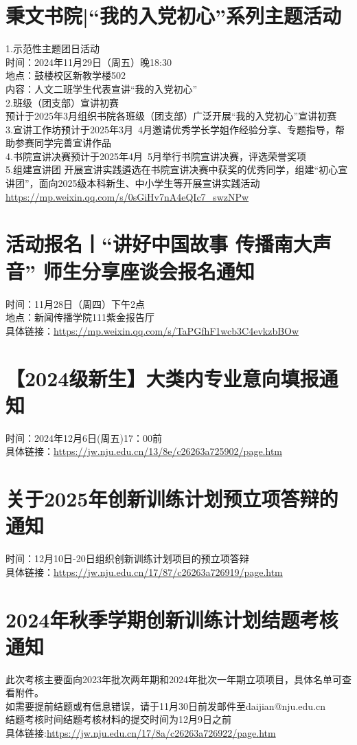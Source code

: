 \documentclass[letterpaper, 12pt]{article}
\begin{document}
\begin{multicols}{2}
\section{ 秉文书院|“我的入党初心”系列主题活动}
1.示范性主题团日活动\\
时间：2024年11月29日（周五）晚18:30\\
地点：鼓楼校区新教学楼502\\
内容：人文二班学生代表宣讲“我的入党初心”\\
2.班级（团支部）宣讲初赛\\
预计于2025年3月组织书院各班级（团支部）广泛开展“我的入党初心”宣讲初赛\\
3.宣讲工作坊预计于2025年3月~4月邀请优秀学长学姐作经验分享、专题指导，帮助参赛同学完善宣讲作品\\
4.书院宣讲决赛预计于2025年4月~5月举行书院宣讲决赛，评选荣誉奖项\\
5.组建宣讲团 开展宣讲实践遴选在书院宣讲决赛中获奖的优秀同学，组建“初心宣讲团”，面向2025级本科新生、中小学生等开展宣讲实践活动\\
\url{https://mp.weixin.qq.com/s/0sGiHv7nA4eQIc7_swzNPw}

\section{活动报名丨“讲好中国故事 传播南大声音” 师生分享座谈会报名通知}
时间：11月28日（周四）下午2点\\
地点：新闻传播学院111紫金报告厅\\
具体链接：\url{https://mp.weixin.qq.com/s/TaPGfhF1wcb3C4evkzbBOw}\\

\section{【2024级新生】大类内专业意向填报通知}
时间：2024年12月6日(周五)17：00前\\
具体链接：\url{https://jw.nju.edu.cn/13/8e/c26263a725902/page.htm}\\

\section{关于2025年创新训练计划预立项答辩的通知}
时间：12月10日-20日组织创新训练计划项目的预立项答辩\\
具体链接：\url{https://jw.nju.edu.cn/17/87/c26263a726919/page.htm}\\

\section{2024年秋季学期创新训练计划结题考核通知}
此次考核主要面向2023年批次两年期和2024年批次一年期立项项目，具体名单可查看附件。\\
如需要提前结题或有信息错误，请于11月30日前发邮件至daijian@nju.edu.cn\\
结题考核时间结题考核材料的提交时间为12月9日之前\\
具体链接:\url{https://jw.nju.edu.cn/17/8a/c26263a726922/page.htm}\\

\end{multicols} 
\end{document}

